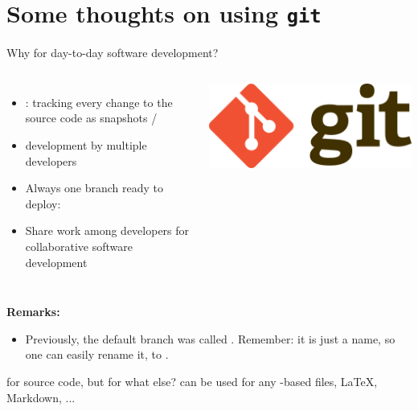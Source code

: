 \section{Some thoughts on using \texttt{git}}

\begin{frame}{Why  for day-to-day software development?}
\begin{columns}
\begin{itemize}
\item {}: tracking every change to the source code as snapshots / 
\item {} development by multiple developers
\item Always one branch ready to deploy: 
\item Share work among developers for collaborative software development
\end{itemize}
\includegraphics[width=\columnwidth]{images/logo_git.png}
\end{columns}

\vspace{1em}
\textbf{Remarks:}
\begin{itemize}
\item Previously, the default branch was called . Remember: it is just a name, so one can easily rename it, {\eg} to .
\end{itemize}

\begin{block}{ for source code, but for what else?}
 can be used for any -based files, {\eg} \LaTeX, Markdown, ...
\end{block}
\end{frame}

